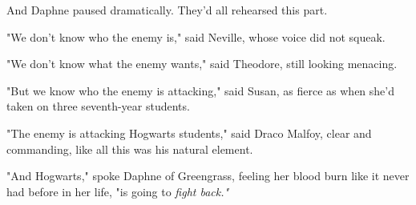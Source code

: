 And Daphne paused dramatically. They'd all rehearsed this part.

"We don't know who the enemy is," said Neville, whose voice did not squeak.

"We don't know what the enemy wants," said Theodore, still looking menacing.

"But we know who the enemy is attacking," said Susan, as fierce as when she'd 
taken on three seventh-year students.

"The enemy is attacking Hogwarts students," said Draco Malfoy, clear and 
commanding, like all this was his natural element.

"And Hogwarts," spoke Daphne of Greengrass, feeling her blood burn like it 
never had before in her life, "is going to \emph{fight back."}